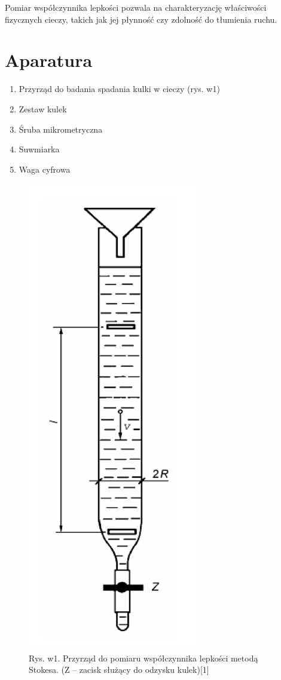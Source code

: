 \documentclass[12pt]{article}
\begin{document}
Pomiar współczynnika lepkości pozwala na charakteryzację właściwości fizycznych cieczy, takich jak jej płynność czy zdolność do tłumienia ruchu.


\section{Aparatura}

\begin{enumerate}
    \item Przyrząd do badania spadania kulki w cieczy (rys. w1)
    \item Zestaw kulek
    \item Śruba mikrometryczna
    \item Suwmiarka
    \item Waga cyfrowa
\end{enumerate}

\begin{figure}[h]
\centering
\captionsetup{width=.7\linewidth}
\includegraphics[scale=0.4]{rysunek1.png}
\caption{Rys. w1. Przyrząd do pomiaru współczynnika lepkości metodą Stokesa. (Z – zacisk służący do odzysku kulek)[1]}
\label{fig:example}
\end{figure}
\end{document}
